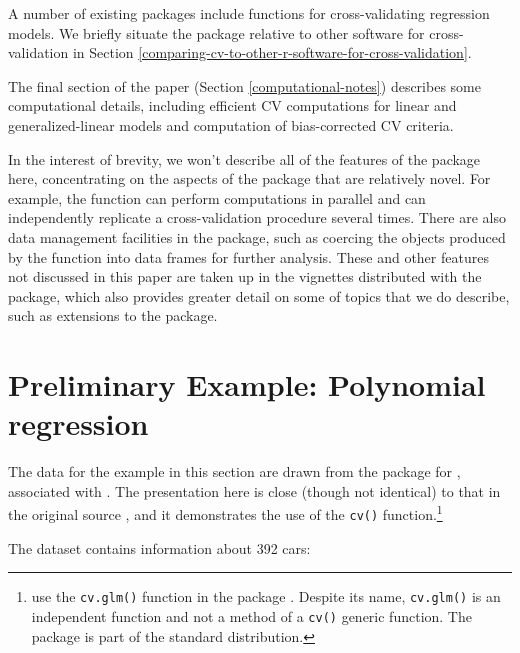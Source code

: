 \documentclass[
]{jss}
\begin{document}
A number of existing  packages include functions for
cross-validating regression models. We briefly situate the 
package relative to other  software for cross-validation in
Section \ref{comparing-cv-to-other-r-software-for-cross-validation}.

The final section of the paper (Section \ref{computational-notes})
describes some computational details, including efficient CV
computations for linear and generalized-linear models and computation of
bias-corrected CV criteria.

In the interest of brevity, we won't describe all of the features of the
 package here, concentrating on the aspects of the package that
are relatively novel. For example, the  function can perform
computations in parallel and can independently replicate a
cross-validation procedure several times. There are also data management
facilities in the package, such as coercing the objects produced by the
 function into data frames for further analysis. These and
other features not discussed in this paper are taken up in the vignettes
distributed with the package, which also provides greater detail on some
of topics that we do describe, such as extensions to the package.

\section{Preliminary Example: Polynomial
regression}\label{preliminary-example-polynomial-regression}

The data for the example in this section are drawn from the 
package for , associated with \citet{JamesEtAl:2021}. The
presentation here is close (though not identical) to that in the
original source \citep[ Secs. 5.1, 5.3]{JamesEtAl:2021}, and it
demonstrates the use of the \texttt{cv()} function.\footnote{\citet{JamesEtAl:2021}
  use the \texttt{cv.glm()} function in the  package
  \citep{CantyRipley2022, DavisonHinkley:1997}. Despite its name,
  \texttt{cv.glm()} is an independent function and not a method of a
  \texttt{cv()} generic function. The  package is part of the
  standard  distribution.}

The  dataset contains information about 392 cars:
\end{document}
